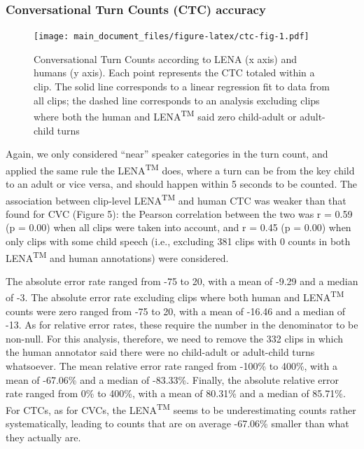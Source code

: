 \documentclass[english,table,man,floatsintext]{apa6}
\begin{document}
\hypertarget{conversational-turn-counts-ctc-accuracy}{%
\subsubsection{Conversational Turn Counts (CTC) accuracy}\label{conversational-turn-counts-ctc-accuracy}}

\begin{figure}
\centering
\texttt{[image: main\_document\_files/figure-latex/ctc-fig-1.pdf]}
\caption{\label{fig:ctc-fig}Conversational Turn Counts according to LENA (x axis) and humans (y axis). Each point represents the CTC totaled within a clip. The solid line corresponds to a linear regression fit to data from all clips; the dashed line corresponds to an analysis excluding clips where both the human and LENA\textsuperscript{TM} said zero child-adult or adult-child turns}
\end{figure}

Again, we only considered \enquote{near} speaker categories in the turn count, and applied the same rule the LENA\textsuperscript{TM} does, where a turn can be from the key child to an adult or vice versa, and should happen within 5 seconds to be counted. The association between clip-level LENA\textsuperscript{TM} and human CTC was weaker than that found for CVC (Figure 5): the Pearson correlation between the two was r = 0.59 (p = 0.00) when all clips were taken into account, and r = 0.45 (p = 0.00) when only clips with some child speech (i.e., excluding 381 clips with 0 counts in both LENA\textsuperscript{TM} and human annotations) were considered.

The absolute error rate ranged from -75 to 20, with a mean of -9.29 and a median of -3. The absolute error rate excluding clips where both human and LENA\textsuperscript{TM} counts were zero ranged from -75 to 20, with a mean of -16.46 and a median of -13. As for relative error rates, these require the number in the denominator to be non-null. For this analysis, therefore, we need to remove the 332 clips in which the human annotator said there were no child-adult or adult-child turns whatsoever. The mean relative error rate ranged from -100\% to 400\%, with a mean of -67.06\% and a median of -83.33\%. Finally, the absolute relative error rate ranged from 0\% to 400\%, with a mean of 80.31\% and a median of 85.71\%. For CTCs, as for CVCs, the LENA\textsuperscript{TM} seems to be underestimating counts rather systematically, leading to counts that are on average -67.06\% smaller than what they actually are.
\end{document}
